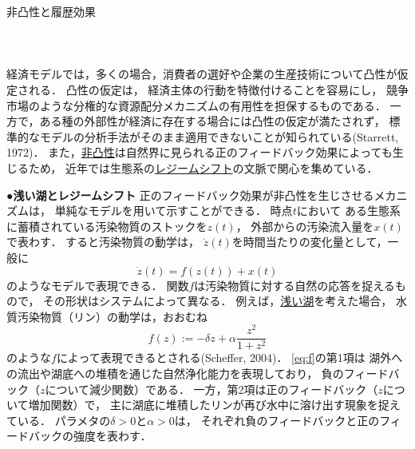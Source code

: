 \documentclass[11pt,a4paper]{article}
\begin{document}
\noindent
非凸性と履歴効果\\
\ \\
\ \\
\ \\

経済モデルでは，多くの場合，消費者の選好や企業の生産技術について凸性が仮定される．
凸性の仮定は，
経済主体の行動を特徴付けることを容易にし，
競争市場のような分権的な資源配分メカニズムの有用性を担保するものである．
一方で，ある種の外部性が経済に存在する場合には凸性の仮定が満たされず，
標準的なモデルの分析手法がそのまま適用できないことが知られている(Starrett, 1972)．
また，\underline{非凸性}は自然界に見られる正のフィードバック効果によっても生じるため，
近年では生態系の\underline{レジームシフト}の文脈で関心を集めている．

\noindent\textbf{●浅い湖とレジームシフト}\hspace{0.5em}
正のフィードバック効果が非凸性を生じさせるメカニズムは，
単純なモデルを用いて示すことができる．
時点$t$において
ある生態系に蓄積されている汚染物質のストックを$z(t)$，
外部からの汚染流入量を$x(t)$で表わす．
すると汚染物質の動学は，
$\dot{z}(t)$を時間当たりの変化量として，一般に
\begin{equation}\label{eq:z}%
  \dot{z}(t) = f(z(t)) + x(t)
\end{equation}
のようなモデルで表現できる．
関数$f$は汚染物質に対する自然の応答を捉えるもので，
その形状はシステムによって異なる．
例えば，\underline{浅い湖}を考えた場合，
水質汚染物質（リン）の動学は，おおむね
\begin{equation}\label{eq:f}%
  f(z) := -\delta z + \alpha\frac{z^{2}}{1+z^{2}}
\end{equation}
のような$f$によって表現できるとされる(Scheffer, 2004)．
\eqref{eq:f}の第1項は
湖外への流出や湖底への堆積を通じた自然浄化能力を表現しており，
負のフィードバック（$z$について減少関数）である．
一方，第2項は正のフィードバック（$z$について増加関数）で，
主に湖底に堆積したリンが再び水中に溶け出す現象を捉えている．
パラメタの$\delta >0$と$\alpha >0$は，
それぞれ負のフィードバックと正のフィードバックの強度を表わす．
\end{document}
